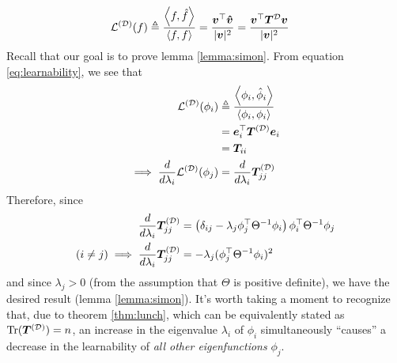 \documentclass{article}
\renewcommand\vec[2][]{\bm{#2}_{#1}}
\newcommand\mc{\mathcal}
\begin{document}
\begin{align}
	\mc L^{(\mc D)}(f)
	&\triangleq \frac{\innerprod{f}{\hat f}}{\innerprod{f}{f}}
	= \frac{\vec v^\top \vec{\hat v}}{|\vec v|^2} 
	= \frac{\vec v^\top \matr{T}^{\mc D} \vec{v}}{|\vec v|^2} \label{eq:learnability}
\end{align}
Recall that our goal is to prove lemma \ref{lemma:simon}. From equation \ref{eq:learnability}, we see that 
\begin{align}
	\mc L^{(\mc D)}(\phi_i)	
		&\triangleq \frac{  \innerprod{\phi_i}{\hat\phi_i} }{  \innerprod{\phi_i}{\phi_i} } \\
		&= \vec[i]{e}^\top \matr{T}^{(\mc D)} \vec[i]{e}  \\
		&= \vec[ii]{T}  \\
	\implies 
		\deriv{}{\lambda_i} \mc L^{(\mc D)}(\phi_j) 
			&= \deriv{}{\lambda_i}  \matr[jj]{T}^{(\mc D)}
\end{align}
Therefore, since
\begin{align}
	\deriv{}{\lambda_i} \matr[jj]{T}^{(\mc D)}
		&=  \lr{\delta_{ij} - \lambda_j \phi_j^\top \Theta^{-1} \phi_i } \phi_i^\top \Theta^{-1}\phi_j \\
	(i \neq j) \implies
		\deriv{}{\lambda_i} \matr[jj]{T}^{(\mc D)}
			&=   - \lambda_j (\phi_j^\top \Theta^{-1} \phi_i )^2
\end{align}
and since $\lambda_j > 0$ (from the assumption that $\Theta$ is positive definite), we have the desired result (lemma \ref{lemma:simon}). It's worth taking a moment to recognize that, due to theorem \ref{thm:lunch}, which can be equivalently stated as $\text{Tr}(\matr{T}^{(\mc D)}) = n$, an increase in the eigenvalue $\lambda_i$ of $\phi_i$ simultaneously ``causes'' a decrease in the learnability of \textit{all other eigenfunctions} $\phi_j$.
\end{document}
